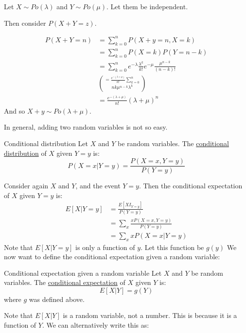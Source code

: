 \documentclass[../Main.tex]{subfiles}
\begin{document}
\begin{example}
    Let $X \sim Po(\lambda)$ and $Y \sim Po(\mu)$. Let them be independent.\par
    Then consider $P(X + Y = z)$.\par
    \begin{align*}
        P(X + Y = n) &= \sum_{k = 0}^n P(X + y = n, X = k) \\
        &= \sum_{k = 0}^n P(X = k) P(Y = n-k) \\
        &= \sum_{k = 0}^n e^{-\lambda} \frac{\lambda^k}{k!} e^{-\mu} \frac{\mu^{n-k}}{(n-k)!} \\
        &= \frac{e^{-(\lambda + \mu)}}{n!} \sum_{k = 0}^n \choose{n}{k} \mu^{n-k} \lambda^k \\
        &= \frac{e^{-(\lambda + \mu)}}{n!} (\lambda + \mu)^n
    \end{align*}
    And so $X + y \sim Po(\lambda + \mu)$.\par
    In general, adding two random variables is not so easy.
\end{example}
\begin{definition}{Conditional distribution}
    Let $X$ and $Y$ be random variables. The \underline{conditional distribution} of $X$ given $Y = y$ is:
    \begin{equation*}
        P(X = x | Y = y) = \frac{P(X = x, Y = y)}{P(Y = y)}
    \end{equation*}
\end{definition}
Consider again $X$ and $Y$, and the event $Y = y$. Then the conditional expectation of $X$ given $Y = y$ is:
\begin{align*}
    E[X | Y = y] &= \frac{E[X I_{Y = y}]}{P(Y = y)} \\
    &= \sum_x \frac{xP(X = x, Y = y)}{P(Y = y)} \\
    &= \sum_x x P(X = x | Y = y)
\end{align*}    
Note that $E[X | Y = y]$ is only a function of $y$. Let this function be $g(y)$
We now want to define the conditional expectation given a random variable:
\begin{definition}{Conditional expectation given a random variable}
    Let $X$ and $Y$ be random variables. The \underline{conditional expectation} of $X$ given $Y$ is:
    \begin{equation*}
        E[X | Y] = g(Y)
    \end{equation*}
    where $g$ was defined above.
\end{definition}
Note that $E[X | Y]$ is a random variable, not a number. This is because it is a function of $Y$. We can alternatively write this as:
\end{document}
